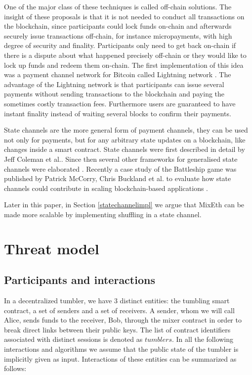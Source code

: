 \documentclass[a4paper,UKenglish,cleveref, autoref]{oasics-v2019}
\begin{document}
One of the major class of these techniques is called off-chain solutions. The insight of these proposals is that it is not needed to conduct all transactions on the blockchain, since participants could lock funds on-chain and afterwards securely issue transactions off-chain, for instance micropayments, with high degree of security and finality. Participants only need to get back on-chain if there is a dispute about what happened precisely off-chain or they would like to lock up funds and redeem them on-chain. The first implementation of this idea was a payment channel network for Bitcoin called Lightning network \cite{poon2016bitcoin}. The advantage of the Lightning network is that participants can issue several payments without sending transactions to the blockchain and paying the sometimes costly transaction fees. Furthermore users are guaranteed to have instant finality instead of waiting several blocks to confirm their payments. 

State channels are the more general form of payment channels, they can be used not only for payments, but for any arbitrary state updates on a blockchain, like changes inside a smart contract. State channels were first described in detail by Jeff Coleman et al.\cite{coleman2018counterfactual}. Since then several other frameworks for generalised state channels were elaborated \cite{dziembowski2017perun,mccorryyou}. Recently a case study of the Battleship game was published by Patrick McCorry, Chris Buckland et al. to evaluate how state channels could contribute in scaling blockchain-based applications \cite{mccorryyou}.  

Later in this paper, in Section \ref{statechannelimpl} we argue that MixEth can be made more scalable by implementing shuffling in a state channel.  

\section{Threat model}
\subsection{Participants and interactions}
In a decentralized tumbler, we have $3$ distinct entities: the tumbling smart contract, a set of senders and a set of receivers. A sender, whom we will call Alice, sends funds to the receiver, Bob, through the mixer contract in order to break direct links between their public keys. The list of contract identifiers associated with distinct sessions is denoted as $tumblers$. In all the following interactions and algorithms we assume that the public state of the tumbler is implicitly given as input. Interactions of these entities can be summarized as follows: 
\end{document}
